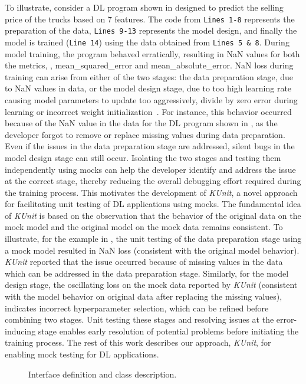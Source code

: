 To illustrate, consider a DL program shown in  designed to predict the selling price of the trucks based on 7 features. 
The code from \texttt{Lines 1-8} represents the preparation of the data, \texttt{Lines 9-13} represents the model design, and finally the model is trained (\texttt{Line 14}) using the data obtained from \texttt{Lines 5 \& 8}.
During model training, the program behaved erratically, resulting in NaN values for both the metrics, \ie, mean\_squared\_error and mean\_absolute\_error.
NaN loss during training can arise from either of the two stages: the data preparation stage, due to NaN values in data, or the model design stage, due to too high learning rate causing model parameters to update too aggressively, divide by zero error during learning or incorrect weight initialization~\cite{wardat21DeepLocalize}. 
For instance, this behavior occurred because of the NaN value in the data for the DL program shown in , as the developer forgot to remove or replace missing values during data preparation.
Even if the issues in the data preparation stage are addressed, silent bugs in the model design stage can still occur.
Isolating the two stages and testing them independently using mocks can help the developer identify and address the issue at the correct stage,
thereby reducing the overall debugging effort required during the training process.
This motivates the development of {\em KUnit}, a novel approach for facilitating unit testing of DL applications using mocks.
The fundamental idea of {\em KUnit} is based on the observation that the behavior of the original data on the mock model and the original model on the mock data remains consistent.
To illustrate, for the example in , the unit testing of the data preparation stage using a mock model resulted in NaN loss
(consistent with the original model behavior). 
{\em KUnit} reported that the issue occurred because of missing values in the data which can be addressed in the data preparation stage.
Similarly, for the model design stage, the oscillating loss on the mock data reported by {\em KUnit} (consistent with the model behavior on original data after replacing the missing values), indicates incorrect hyperparameter selection, which can be refined before combining two stages.
Unit testing these stages and resolving issues at the error-inducing stage enables early resolution of potential problems before initiating the training process.
The rest of this work describes our approach, {\em KUnit}, for enabling mock testing for DL applications.


\begin{figure*}[t!]
    \centering
    \qquad
    \caption{Interface definition and class description.}%
    \label{fig:InterfaceDefinition}
\vspace{-0.6cm}
\end{figure*}


